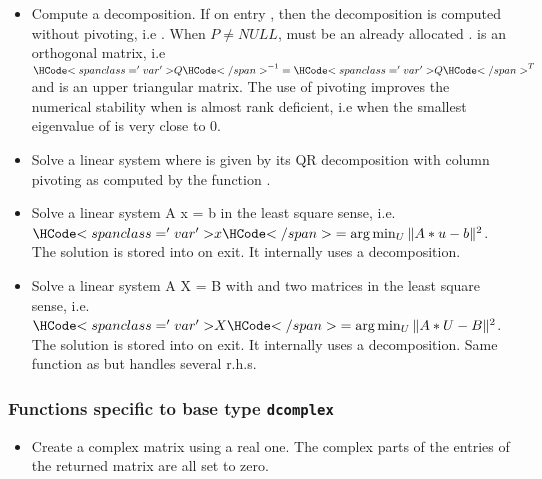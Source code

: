 \begin{itemize}
\item {} 
  \sshortdescribe Compute a  decomposition. If on entry
  , then the decomposition is computed without pivoting, i.e
  . When $P \ne NULL$,  must be an already allocated
  .  is an orthogonal matrix, i.e
  $\var{Q}^{-1} = \var{Q}^{T}$ and  is an upper triangular matrix. The
  use of pivoting improves the numerical stability when  is almost rank
  deficient, i.e when the smallest eigenvalue of  is very close to $0$.

\item {}
  \sshortdescribe Solve a linear system  where  is given by
  its QR decomposition with column pivoting as computed by the function
  .
\item {}
  \sshortdescribe Solve a linear system A x = b in the least square sense,
  i.e. $\var{x} = \arg\min_U \| A * u - b\|^2$. The solution is stored into
   on exit. It internally uses a  decomposition.

\item {}
  \sshortdescribe Solve a linear system A X = B with  and  two
  matrices in the least square sense, i.e. $\var{X} = \arg\min_U \| A * U -
  B\|^2$. The solution is stored into  on exit. It internally uses a
   decomposition. Same function as  but handles
  several r.h.s.

\end{itemize}

\subsubsection{Functions specific to base type {\tt dcomplex}}

\begin{itemize}
  \item {}
    \sshortdescribe Create a complex matrix using a real one. The complex parts
    of the entries of the returned matrix are all set to zero.
\end{itemize}

